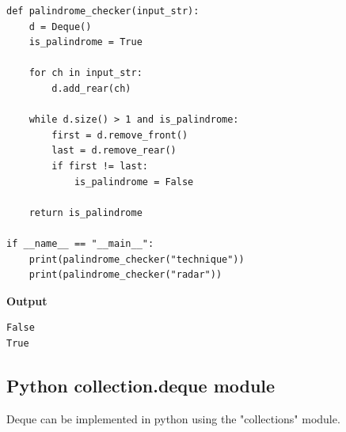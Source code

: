 \documentclass[a4paper,11pt]{book}
\begin{document}
\begin{lstlisting}
def palindrome_checker(input_str):
    d = Deque()
    is_palindrome = True
    
    for ch in input_str:
        d.add_rear(ch)
    
    while d.size() > 1 and is_palindrome:
        first = d.remove_front()
        last = d.remove_rear()
        if first != last:
            is_palindrome = False
    
    return is_palindrome

if __name__ == "__main__":
	print(palindrome_checker("technique"))
	print(palindrome_checker("radar"))
\end{lstlisting}
\textbf{Output}
\begin{lstlisting}
False
True
\end{lstlisting}
\subsection{Python collection.deque module}
\noindent Deque can be implemented in python using the "collections" module.\\
 
\end{document}
